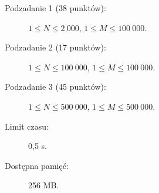 \documentclass{boi2014-pl}
\begin{document}
    \Scoring

    \begin{description}
        \item[Podzadanie 1 (38 punktów):] $1 \le N \le 2\ 000$, $1 \le M \le 100\ 000$.
        \item[Podzadanie 2 (17 punktów):] $1 \le N \le 100\ 000$, $1 \le M \le 100\ 000$.
        \item[Podzadanie 3 (45 punktów):] $1 \le N \le 500\ 000$, $1 \le M \le 500\ 000$.
    \end{description}

    \Constraints

    \begin{description}
        \item[Limit czasu:] 0,5 s.
        \item[Dostępna pamięć:] 256 MB.
    \end{description}
\end{document}
